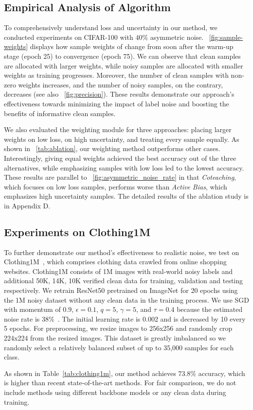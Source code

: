 \subsection{ Empirical Analysis of Algorithm }
To comprehensively understand loss and uncertainty in our method, we conducted experiments on CIFAR-100 with 40\% asymmetric noise. \figurename~\ref{fig:sample-weights} displays how sample weights of \prgname{} change from soon after the warm-up stage (epoch 25) to convergence (epoch 75). 
We can observe that clean samples are allocated with larger weights, while noisy samples are allocated with smaller weights as training progresses. Moreover, the number of clean samples with non-zero weights increases, and the number of noisy samples, on the contrary, decreases (see also \figurename~\ref{fig:precision}). These results demonstrate our approach's effectiveness towards minimizing the impact of label noise and boosting the benefits of informative clean samples.

We also evaluated the weighting module for three approaches: placing larger weights on low loss, on high uncertainty, and treating every sample equally. As shown in \tablename~\ref{tab:ablation}, our weighting method outperforms other cases. Interestingly, giving equal weights achieved the best accuracy out of the three alternatives, while emphasizing samples with low loss led to the lowest accuracy. These results are parallel to \figurename~\ref{fig:asymmetric_noise_rate} in that \textit{Coteaching}, which focuses on low loss samples, performs worse than \textit{Active Bias}, which emphasizes high uncertainty samples. The detailed results of the ablation study is in Appendix D.

\subsection{Experiments on Clothing1M}
To further demonstrate our method’s effectiveness to realistic noise, we test on Clothing1M~\cite{xiao2015learning}, which comprises clothing data crawled from online shopping websites. Clothing1M consists of 1M images with real-world noisy labels and additional 50K, 14K, 10K verified clean data for training, validation and testing respectively. We retrain ResNet50 pretrained on ImageNet for 20 epochs using the 1M noisy dataset without any clean data in the training process. We use SGD with momentum of 0.9, $\epsilon=0.1$, $q=5$, $\gamma=5$, and $\tau=0.4$ because the estimated noise rate is 38\%~\cite{huang2019o2u, yi2019probabilistic}. The initial learning rate is 0.002 and is decreased by 10 every 5 epochs. For preprocessing, we resize images to 256x256 and randomly crop 224x224 from the resized images. This dataset is greatly imbalanced so we randomly select a relatively balanced subset of up to 35,000 samples for each class. 

As shown in Table~\ref{tab:clothing1m}, our method achieves 73.8\% accuracy, which is higher than recent state-of-the-art methods. For fair comparison, we do not include methods using different backbone models or any clean data during training.
